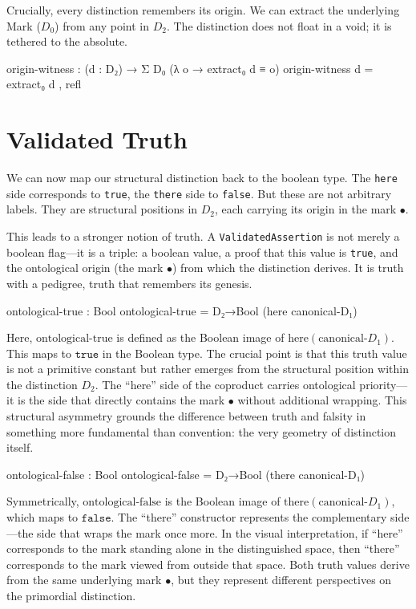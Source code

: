 \documentclass[11pt,a4paper]{book}
\begin{document}
Crucially, every distinction remembers its origin. We can extract the underlying Mark ($D_0$) from any point in $D_2$. The distinction does not float in a void; it is tethered to the absolute.

\begin{code}
origin-witness : (d : D₂) → Σ D₀ (λ o → extract₀ d ≡ o)
origin-witness d = extract₀ d , refl
\end{code}

\section{Validated Truth}

We can now map our structural distinction back to the boolean type. The \texttt{here} 
side corresponds to \texttt{true}, the \texttt{there} side to \texttt{false}. But 
these are not arbitrary labels. They are structural positions in $D_2$, each carrying 
its origin in the mark $\bullet$.

This leads to a stronger notion of truth. A \texttt{ValidatedAssertion} is not merely 
a boolean flag—it is a triple: a boolean value, a proof that this value is 
\texttt{true}, and the ontological origin (the mark $\bullet$) from which the 
distinction derives. It is truth with a pedigree, truth that remembers its genesis.

\begin{code}
ontological-true : Bool
ontological-true = D₂→Bool (here canonical-D₁)
\end{code}

Here, $\text{ontological-true}$ is defined as the Boolean image of $\text{here}(\text{canonical-}D_1)$. 
This maps to $\texttt{true}$ in the Boolean type. The crucial point is that this truth value is not a primitive constant but rather emerges from the structural position within the distinction $D_2$. The ``here'' side of the coproduct carries ontological priority—it is the side that directly contains the mark $\bullet$ without additional wrapping. This structural asymmetry grounds the difference between truth and falsity in something more fundamental than convention: the very geometry of distinction itself.

\begin{code}
ontological-false : Bool
ontological-false = D₂→Bool (there canonical-D₁)
\end{code}

Symmetrically, $\text{ontological-false}$ is the Boolean image of $\text{there}(\text{canonical-}D_1)$, 
which maps to $\texttt{false}$. The ``there'' constructor represents the complementary side—the side that wraps the mark once more. In the visual interpretation, if ``here'' corresponds to the mark standing alone in the distinguished space, then ``there'' corresponds to the mark viewed from outside that space. Both truth values derive from the same underlying mark $\bullet$, but they represent different perspectives on the primordial distinction.
\end{document}
